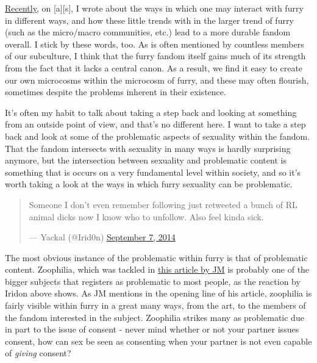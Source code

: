 
\href{http://adjectivespecies.com/2014/06/25/trends-within-trends/}{Recently}, on {[}a{]}{[}s{]}, I wrote about the ways in which one may interact with furry in different ways, and how these little trends with in the larger trend of furry (such as the micro/macro communities, etc.) lead to a more durable fandom overall. I stick by these words, too. As is often mentioned by countless members of our subculture, I think that the furry fandom itself gains much of its strength from the fact that it lacks a central canon. As a result, we find it easy to create our own microcosms within the microcosm of furry, and these may often flourish, sometimes despite the problems inherent in their existence.

It's often my habit to talk about taking a step back and looking at something from an outside point of view, and that's no different here. I want to take a step back and look at some of the problematic aspects of sexuality within the fandom. That the fandom intersects with sexuality in many ways is hardly surprising anymore, but the intersection between sexuality and problematic content is something that is occurs on a very fundamental level within society, and so it's worth taking a look at the ways in which furry sexuality can be problematic.

\begin{quote}
Someone I don't even remember following just retweeted a bunch of RL animal dicks now I know who to unfollow. Also feel kinda sick.

--- Yackal (@Irid0n) \href{https://twitter.com/Irid0n/status/508649770899238913}{September 7, 2014}
\end{quote}

The most obvious instance of the problematic within furry is that of problematic content. Zoophilia, which was tackled in \href{http://adjectivespecies.com/2013/01/14/why-zoophilia-is-a-furry-issue/}{this article by JM} is probably one of the bigger subjects that registers as problematic to most people, as the reaction by Iridon above shows. As JM mentions in the opening line of his article, zoophilia is fairly visible within furry in a great many ways, from the art, to the members of the fandom interested in the subject. Zoophilia strikes many as problematic due in part to the issue of consent - never mind whether or not your partner issues consent, how can sex be seen as consenting when your partner is not even capable of \emph{giving} consent?

